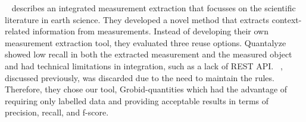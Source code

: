 ~\cite{hundman2017measurement} describes an integrated measurement extraction that focusses on the scientific literature in earth science. 
They developed a novel method that extracts context-related information from measurements. Instead of developing their own measurement extraction tool, they evaluated three reuse options. Quantalyze showed low recall in both the extracted measurement and the measured object and had technical limitations in integration, such as a lack of REST API. ~\cite{agatonovic2008large}, discussed previously, was discarded due to the need to maintain the rules. 
Therefore, they chose our tool, Grobid-quantities which had the advantage of requiring only labelled data and providing acceptable results in terms of precision, recall, and f-score. 






